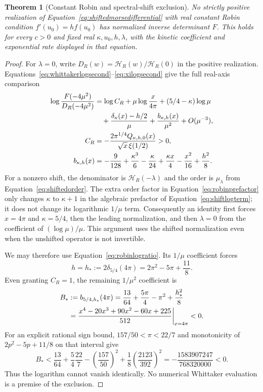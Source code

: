 \documentclass[11pt,letterpaper]{article}
\numberwithin{equation}{section}
\newtheorem{theorem}{Theorem}[section]
\theoremstyle{definition}
\theoremstyle{remark}
\begin{document}
\begin{theorem}[Constant Robin and spectral-shift exclusion]
\label{thm:robinmorseexclusion}
No strictly positive realization of Equation~\eqref{eq:shiftedmorsedifferential} with real constant Robin condition $f'(u_0)=hf(u_0)$ has normalized inverse determinant $F$. This holds for every $c>0$ and fixed real $\kappa,u_0,h,\lambda$, with the kinetic coefficient and exponential rate displayed in that equation.
\end{theorem}
\begin{proof}
For $\lambda=0$, write $D_R(w)=\mathcal H_R(w)/\mathcal H_R(0)$ in the positive realization. Equations~\eqref{eq:whittakerlogsecond}--\eqref{eq:xilogsecond} give the full real-axis comparison
\begin{align}
 \log\frac{F(-4\mu^2)}{D_R(-4\mu^2)}
 &=\log C_R+\mu\log\frac{x}{4\pi}
       +(5/4-\kappa)\log\mu\notag\\
 &\quad+\frac{\delta_\kappa(x)-h/2}{\mu}
       +\frac{b_{\kappa,h}(x)}{\mu^2}+O(\mu^{-3}),
 \label{eq:robinlogratio}\\
 C_R&=-\frac{2\pi^{1/4}Q_{\kappa,h,0}(x)}{\sqrt x\,\xi(1/2)}>0,\notag\\
 b_{\kappa,h}(x)&=-\frac9{128}+\frac{\kappa^3}{6}-\frac{\kappa}{24}
                  +\frac{\kappa x}{4}-\frac{x^2}{16}+\frac{h^2}{8}.
 \label{eq:robinsecondcoefficient}
\end{align}
For a nonzero shift, the denominator is $\mathcal H_R(-\lambda)$ and the order is $\mu_\lambda$ from Equation~\eqref{eq:shiftedorder}. The extra order factor in Equation~\eqref{eq:robinprefactor} only changes $\kappa$ to $\kappa+1$ in the algebraic prefactor of Equation~\eqref{eq:shiftlogterm}; it does not change its logarithmic $1/\mu$ term. Consequently an identity first forces $x=4\pi$ and $\kappa=5/4$, then the leading normalization, and then $\lambda=0$ from the coefficient of $(\log\mu)/\mu$. This argument uses the shifted normalization even when the unshifted operator is not invertible.

We may therefore use Equation~\eqref{eq:robinlogratio}. Its $1/\mu$ coefficient forces
\begin{equation}
 h=h_*:=2\delta_{5/4}(4\pi)
       =2\pi^2-5\pi+\frac{11}{8}.
 \label{eq:matchedrobinh}
\end{equation}
Even granting $C_R=1$, the remaining $1/\mu^2$ coefficient is
\begin{align}
 B_*&:=b_{5/4,h_*}(4\pi)
     =\frac{13}{64}+\frac{5\pi}{4}-\pi^2+\frac{h_*^2}{8}\notag\\
 &=\frac{x^4-20x^3+90x^2-60x+225}{512}\bigg|_{x=4\pi}<0.
 \label{eq:robinanalyticobstruction}
\end{align}
For an explicit rational sign bound, $157/50<\pi<22/7$ and monotonicity of $2p^2-5p+11/8$ on that interval give
\begin{equation}
 B_*<\frac{13}{64}+\frac54\frac{22}{7}
           -\left(\frac{157}{50}\right)^2
           +\frac18\left(\frac{2123}{392}\right)^2
      =-\frac{1583907247}{768320000}<0.
 \label{eq:robinrationalbound}
\end{equation}
Thus the logarithm cannot vanish identically. No numerical Whittaker evaluation is a premise of the exclusion.
\end{proof}
\end{document}
